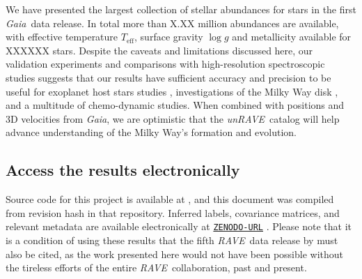 \documentclass[preprint,trackchanges]{aastex}
\newcommand{\acronym}[1]{{\small{#1}}}
\newcommand{\project}[1]{\textsl{#1}}
\newcommand{\gaia}{\project{Gaia}}
\newcommand{\rave}{\project{\acronym{RAVE}}}
\newcommand{\unrave}{\project{unRAVE}}
\newcommand{\teff}{T_{\mathrm{eff}}}
\newcommand{\logg}{\log g}
\begin{document}
We have presented the largest collection of stellar abundances for stars in the 
first \gaia\ data release.  In total more than X.XX million abundances are
available, with effective temperature $\teff$, surface gravity $\logg$ and 
metallicity available for XXXXXX stars.  Despite the caveats and limitations 
discussed here, our validation experiments and comparisons with high-resolution
spectroscopic studies suggests that our results have sufficient accuracy and
precision to be useful for exoplanet host stars studies 
\citep[c.f.,][]{Valenti_Fischer_2005}, investigations of the Milky Way disk 
\citep[c.f.,][]{Reddy_2003,Reddy_2006,Bensby_2014}, and a multitude of 
chemo-dynamic studies.  When combined with positions and 3D velocities from \gaia,
we are optimistic that the \unrave\ catalog will help advance understanding 
of the Milky Way's formation and evolution.


\subsection*{Access the results electronically}

\noindent{}Source code for this project is available at \texttt{\giturl}\hspace{-0.5em},
and this document was compiled from revision hash \texttt{\githash} in that repository.
Inferred labels, covariance matrices, and relevant metadata are available electronically
at \texttt{\url{ZENODO-URL}} \citep{DATA_REPOSITORY}.  Please note that it is a condition
of using these results that the fifth \rave\ data release by \citet{Kunder_2016} must 
also be cited, as the work presented here would not have been possible without the 
tireless efforts of the entire \rave\ collaboration, past and present.
\end{document}
